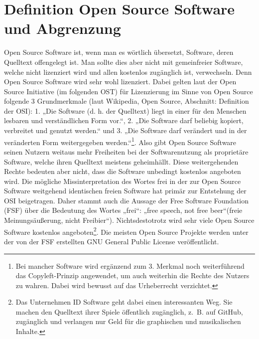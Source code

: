 \documentclass[a4paper,12pt]{article}
\begin{document}
\section{Definition Open Source Software und Abgrenzung}
Open Source Software ist, wenn man es wörtlich übersetzt, Software, deren Quelltext offengelegt ist. Man sollte dies aber nicht mit gemeinfreier Software, welche nicht lizenziert wird und allen kostenlos zugänglich ist, verwechseln. Denn Open Source Software wird sehr wohl lizenziert. Dabei gelten laut der Open Source Initiative (im folgenden OST) für Lizenzierung im Sinne von Open Source folgende 3 Grundmerkmale (laut Wikipedia, Open Source, Abschnitt: Definition der OSI): 1. „Die Software (d. h. der Quelltext) liegt in einer für den Menschen lesbaren und verständlichen Form vor.“, 2. „Die Software darf beliebig kopiert, verbreitet und genutzt werden.“ und 3. „Die Software darf verändert und in der veränderten Form weitergegeben werden.“\footnote{Bei mancher Software wird ergänzend zum 3. Merkmal noch weiterführend das Copyleft-Prinzip angewendet, um auch weiterhin die Rechte des Nutzers zu wahren. Dabei wird bewusst auf das Urheberrecht verzichtet.}. Also gibt Open Source Software seinen Nutzern weitaus mehr Freiheiten bei der Softwarenutzung als proprietäre Software, welche ihren Quelltext meistens geheimhällt. Diese weitergehenden Rechte bedeuten aber nicht, dass die Software unbedingt kostenlos angeboten wird. Die mögliche Missinterpretation des Wortes frei in der zur Open Source Software weitgehend identischen freien Software hat primär zur Entstehung der OSI beigetragen. Daher stammt auch die Aussage der Free Software Foundation (FSF) über die Bedeutung des Wortes „frei“: „free speech, not free beer“(freie Meinungsäußerung, nicht Freibier“). Nichtsdestotrotz wird sehr viele Open Source Software kostenlos angeboten\footnote{Das Unternehmen ID Software geht dabei einen interessanten Weg. Sie machen den Quelltext ihrer Spiele öffentlich zugänglich, z.~B. auf GitHub, zugänglich und verlangen nur Geld für die graphischen und musikalischen Inhalte.}. Die meisten Open Source Projekte werden unter der von der FSF erstellten GNU General Public License veröffentlicht.\\
\end{document}
